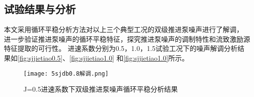 \begin{comment}
为了进一步比较各部件上轴向激励力的大小，选取进速系数为1.0工况下的推进泵各构件激励力数据，
分析各构件激励力在全频段的激励力总级，但是受限于采样频率不到6000Hz，计算中选取了10-2000Hz作为
特征频段进行轴向激励力总级的分析，参考的激振力基准为以$F_{ref}= 1\times 10^{-6}$为底，
对各构件上的激励力总级作了无量纲化处理，即采用前置叶轮的激励力总级进行无量纲化 ($F/F_rotor$)。
因而得到前置叶轮，后置叶轮，导管和导叶上的总激励力相对大小分别为1，0.85，0.24，0.11。

分析了双级推进泵各构件上的激励力在总级中导叶叶频频率处的幅值与各部件上平均推力大小的比值发现，
前后叶轮处的激励力叶频频率处的相对幅值分别达到了38\%和81\%，显著高于导叶4\%和导管的8\%，
可以得出，相比导叶和导管等静部件，前、后叶轮上的轴向激励力脉动更为强烈，

导叶通过频率（SPF）的线谱特征均十分显著，幅值明显高于叶频（BPF）；
2）轴频与其他频率的循环调制现象可以明显在转子频谱中识别出来。例如，一阶叶频（7APF）两侧等间距分布着5APF（7APF-2APF）与9APF（7APF+2APF）。
3）三个部件的轴向力频谱均呈现连续衰减的低频宽带特性。

图10为各工况下的推进泵内压力分布，图中为压力系数，
从压力分布云图可以看出导叶与叶轮的干涉作用十分显著，
前置转子在受来流湍流激励的同时，与导叶发生干涉，后置转子也受到导叶尾迹的影响，
转子的激励力向导管、导叶传播，使得导管、导叶和转子的轴向力脉动频谱中均体现出了导叶叶频及其倍频。
由于后转子入口直接受导叶尾迹的影响，因此后置转子的轴向激励力中导叶通过频率成分最为突出。
结合试验噪声信号的分析，噪声信号和流致振动激励源信号的频谱能量分布显示出良好的一致性，
两者均呈现出低频宽带特征。双级推进泵前后叶轮、导叶与导管四个部件上的非定常力频谱均以导叶频率为主导；
从泵内压力分布云图也可以显示出导叶与叶轮的干涉作用显著。
以上说明导叶与叶轮的相互作用使叶轮非定常力整体上升，如果面向导叶-叶轮匹配性进行优化设计，
通过调整导叶结构特征（如骨线形状，厚度分布规律）、叶轮-导叶间距及导叶叶片数等控制导叶流场分布，
降低其对叶轮流场的干涉，对推进泵总体的振动噪声控制较为有利。
\end{comment}

\subsection{试验结果与分析}
本文采用循环平稳分析方法对以上三个典型工况的双级推进泵噪声进行了解调，
进一步验证推进泵噪声的循环平稳特征，探究推进泵噪声的调制特性和流致激励源特征提取的可行性。
进速系数分别为0.5，1.0，1.5试验工况下的噪声解调分析结果如\autoref{fig:sjjietiao0.5}、\autoref{fig:sjjietiao1.0}
和\autoref{fig:sjjietiao1.0}所示。
\begin{figure}[htbp]
    \centering
    \texttt{[image: 5sjdb0.8解调.png]}
    \caption{\label{fig:sjjietiao0.5}J=0.5进速系数下双级推进泵噪声循环平稳分析结果}
\end{figure}

